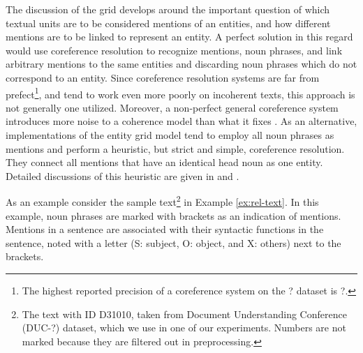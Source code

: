 The discussion of the grid develops around the important question of which textual units are to be considered mentions of an entities, and how different mentions are to be linked to represent an entity. 
A perfect solution in this regard would use coreference resolution to recognize mentions, noun phrases, and link arbitrary mentions to the same entities and discarding noun phrases which do not correspond to an entity. 
Since coreference resolution systems are far from prefect\footnote{The highest reported precision of a coreference system on the ? dataset is ?.}, and tend to work even more poorly on incoherent texts, this approach is not generally one utilized.  
Moreover, a non-perfect general coreference system introduces more noise to a coherence model than what it fixes \cite{barzilay08}.  
As an alternative, implementations of the entity grid model tend to employ all noun phrases as mentions and perform a heuristic, but strict and simple, coreference resolution. 
They connect all mentions that have an identical head noun as one entity. 
Detailed discussions of this heuristic are given in  and . 

As an example consider the sample text\footnote{The text with ID D31010, taken from Document Understanding Conference (DUC-?) dataset, which we use in one of our experiments. Numbers are not marked because they are filtered out in preprocessing.} in Example \ref{ex:rel-text}. 
In this example, noun phrases are marked with brackets as an indication of mentions. 
Mentions in a sentence are associated with their syntactic functions in the sentence, noted with a letter (S: subject, O: object, and X: others) next to the brackets. 

